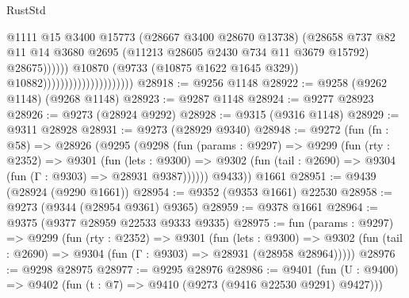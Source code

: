 \begin{lexlean}{RustStd}
\begin{coremodule}
{\begin{coremodule}
{{{{{{{{{{{{{{{{{{{{{{{{{{{{{{{{{{{{{{{{{{{{{{{{{{{{{{{                                                        @1111
                                                        @15
                                                        @3400
                                                        @15773
                                                        (@28667 @3400 @28670 @13738)
                                                        (@28658
                                                          @737
                                                          @82
                                                          @11
                                                          @14
                                                          @3680
                                                          @2695
                                                          (@11213
                                                            @28605
                                                            @2430
                                                            @734
                                                            @11
                                                            @3679
                                                            @15792)
                                                          @28675))))))
                                              @10870
                                              (@9733 (@10875 @1622 @1645 @329))
                                              @10882)))))))))))))))))))))
@28918 := @9256 @1148
@28922 := @9258 (@9262 @1148) (@9268 @1148)
@28923 := @9287 @1148
@28924 := @9277 @28923
@28926 := @9273 (@28924 @9292)
@28928 := @9315 (@9316 @1148)
@28929 := @9311 @28928
@28931 := @9273 (@28929 @9340)
@28948 := @9272
    (fun (fn : @58) =>
    @28926
      (@9295
        (@9298
          (fun (params : @9297) =>
          @9299
            (fun (rty : @2352) =>
            @9301
              (fun (lets : @9300) =>
              @9302 (fun (tail : @2690) => @9304 (fun (Γ : @9303) => @28931 @9387))))))
        @9433))
    @1661
@28951 := @9439 (@28924 (@9290 @1661))
@28954 := @9352 (@9353 @1661) @22530
@28958 := @9273 (@9344 (@28954 @9361) @9365)
@28959 := @9378 @1661
@28964 := @9375 (@9377 @28959 @22533 @9333 @9335)
@28975 := fun (params : @9297) =>
  @9299
    (fun (rty : @2352) =>
    @9301
      (fun (lets : @9300) =>
      @9302 (fun (tail : @2690) => @9304 (fun (Γ : @9303) => @28931 (@28958 @28964)))))
@28976 := @9298 @28975
@28977 := @9295 @28976
@28986 := @9401
    (fun (U : @9400) => @9402 (fun (t : @7) => @9410 (@9273 (@9416 @22530 @9291) @9427)))
}}}}}}}}}}}}}}}}}}}}}}}}}}}}}}}}}}}}}}}}}}}}}}}}}}}}}}}
\end{coremodule}}
\end{coremodule}
\end{lexlean}
